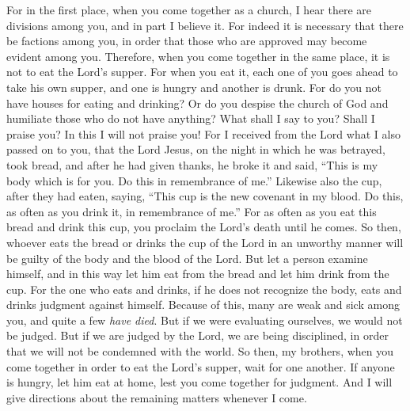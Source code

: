 \begin{biblechapter}
\verse For in the first place, when you come together as a church, I hear there are divisions among you, and in part I believe it.
\verse For indeed it is necessary that there be factions among you, in order that those who are approved may become evident among you.
\verse Therefore, when you come together in the same place, it is not to eat the Lord’s supper.
\verse For when you eat it, each one of you goes ahead to take his own supper, and one is hungry and another is drunk.
\verse For do you not have houses for eating and drinking? Or do you despise the church of God and humiliate those who do not have anything? What shall I say to you? Shall I praise you? In this I will not praise you!
\verse For I received from the Lord what I also passed on to you, that the Lord Jesus, on the night in which he was betrayed, took bread,
\verse and after he had given thanks, he broke it and said, “This is my body which is for you. Do this in remembrance of me.”
\verse Likewise also the cup, after they had eaten, saying, “This cup is the new covenant in my blood. Do this, as often as you drink it, in remembrance of me.”
\verse For as often as you eat this bread and drink this cup, you proclaim the Lord’s death until he comes.
\verse So then, whoever eats the bread or drinks the cup of the Lord in an unworthy manner will be guilty of the body and the blood of the Lord.
\verse But let a person examine himself, and in this way let him eat from the bread and let him drink from the cup.
\verse For the one who eats and drinks, if he does not recognize the body, eats and drinks judgment against himself.
\verse Because of this, many are weak and sick among you, and quite a few \textit{have died}.
\verse But if we were evaluating ourselves, we would not be judged.
\verse But if we are judged by the Lord, we are being disciplined, in order that we will not be condemned with the world.
\verse So then, my brothers, when you come together in order to eat the Lord’s supper, wait for one another.
\verse If anyone is hungry, let him eat at home, lest you come together for judgment. And I will give directions about the remaining matters whenever I come.
\end{biblechapter}

